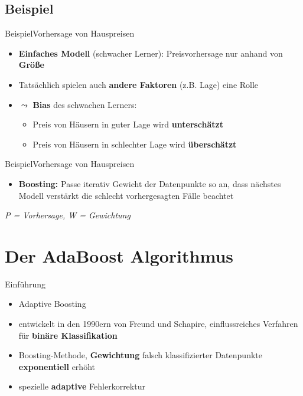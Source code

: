 \documentclass[hyperref={bookmarks=false},11pt,dvipsnames]{beamer}
\begin{document}
\subsection*{Beispiel}
\begin{frame}[t]{Beispiel}{Vorhersage von Hauspreisen}
	\begin{itemize}
		\item <1-> \textbf{Einfaches Modell} (schwacher Lerner): Preisvorhersage nur anhand von \textbf{Größe}
		\item <2-> Tatsächlich spielen auch \textbf{andere Faktoren} (z.B. Lage) eine Rolle
		\item <3-> $\leadsto$ \textbf{Bias} des schwachen Lerners:\\[5pt]
		      \begin{itemize}
			      \item Preis von Häusern in guter Lage wird \textbf{unterschätzt}
			      \item Preis von Häusern in schlechter Lage wird \textbf{überschätzt}
		      \end{itemize}
	\end{itemize}
\end{frame}

\begin{frame}[t]{Beispiel}{Vorhersage von Hauspreisen}
	\begin{itemize}
		\item \textbf{Boosting:} Passe iterativ Gewicht der Datenpunkte so an, dass nächstes Modell verstärkt die schlecht vorhergesagten Fälle beachtet
	\end{itemize}
	\emph{P = Vorhersage, W = Gewichtung}
	\begin{table}
		\centering
		\resizebox{0.95\textwidth}{!}{%
			
		}
		\resizebox{0.95\textwidth}{!}{%
			
		}
	\end{table}
\end{frame}

\section{Der AdaBoost Algorithmus}
\begin{frame}[t]{Einführung}
	\begin{itemize}
		\item <1-> \glqq Adaptive Boosting\grqq
		\item <2-> entwickelt in den 1990ern von Freund und Schapire, einflussreiches Verfahren für \textbf{binäre Klassifikation}
		\item <3-> Boosting-Methode, \textbf{Gewichtung} falsch klassifizierter Datenpunkte \textbf{exponentiell} erhöht
		\item <4-> spezielle \textbf{adaptive} Fehlerkorrektur
	\end{itemize}
\end{frame}
\end{document}
